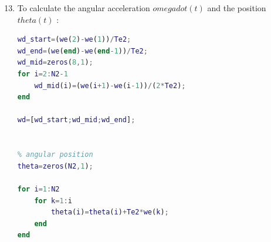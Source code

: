 \documentclass[a4paper,12pt]{article}
\begin{document}
\begin{enumerate}[label={\color{blue}\arabic*)}]
    \setcounter{enumi}{12}

    \item
    To calculate the angular acceleration \(omega dot(t)\) and the position \(theta(t)\) :
     \begin{lstlisting}[style=Matlab-editor,language=Matlab, basicstyle=\small\ttfamily]
% angular acceleration
wd_start=(we(2)-we(1))/Te2;
wd_end=(we(end)-we(end-1))/Te2;
wd_mid=zeros(8,1);
for i=2:N2-1
    wd_mid(i)=(we(i+1)-we(i-1))/(2*Te2);
end

wd=[wd_start;wd_mid;wd_end];


% angular position
theta=zeros(N2,1);

for i=1:N2
    for k=1:i
        theta(i)=theta(i)+Te2*we(k);
    end
end
        \end{lstlisting}


\end{enumerate}
\end{document}
